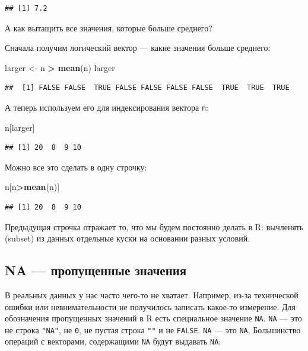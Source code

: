 \documentclass[
]{book}
\newenvironment{Shaded}{\begin{snugshade}}{\end{snugshade}}
\newcommand{\KeywordTok}[1]{\textcolor[rgb]{0.13,0.29,0.53}{\textbf{#1}}}
\newcommand{\NormalTok}[1]{#1}
\newcommand{\OperatorTok}[1]{\textcolor[rgb]{0.81,0.36,0.00}{\textbf{#1}}}
\newcommand{\StringTok}[1]{\textcolor[rgb]{0.31,0.60,0.02}{#1}}
\begin{document}
\begin{verbatim}
## [1] 7.2
\end{verbatim}

А как вытащить все значения, которые больше среднего?

Сначала получим логический вектор --- какие значения больше среднего:

\begin{Shaded}
\begin{Highlighting}[]
\NormalTok{larger <-}\StringTok{ }\NormalTok{n }\OperatorTok{>}\StringTok{ }\KeywordTok{mean}\NormalTok{(n)}
\NormalTok{larger}
\end{Highlighting}
\end{Shaded}

\begin{verbatim}
##  [1] FALSE FALSE  TRUE FALSE FALSE FALSE FALSE  TRUE  TRUE  TRUE
\end{verbatim}

А теперь используем его для индексирования вектора \texttt{n}:

\begin{Shaded}
\begin{Highlighting}[]
\NormalTok{n[larger]}
\end{Highlighting}
\end{Shaded}

\begin{verbatim}
## [1] 20  8  9 10
\end{verbatim}

Можно все это сделать в одну строчку:

\begin{Shaded}
\begin{Highlighting}[]
\NormalTok{n[n}\OperatorTok{>}\KeywordTok{mean}\NormalTok{(n)]}
\end{Highlighting}
\end{Shaded}

\begin{verbatim}
## [1] 20  8  9 10
\end{verbatim}

Предыдущая строчка отражает то, что мы будем постоянно делать в R: вычленять (subset) из данных отдельные куски на основании разных условий.

\hypertarget{na}{%
\subsection{NA --- пропущенные значения}\label{na}}

В реальных данных у нас часто чего-то не хватает. Например, из-за технической ошибки или невнимательности не получилось записать какое-то измерение. Для обозначения пропущенных значений в R есть специальное значение \texttt{NA}. \texttt{NA} --- это не строка \texttt{"NA"}, не \texttt{0}, не пустая строка \texttt{""} и не \texttt{FALSE}. \texttt{NA} --- это \texttt{NA}.
Большинство операций с векторами, содержащими \texttt{NA} будут выдавать \texttt{NA}:
\end{document}
